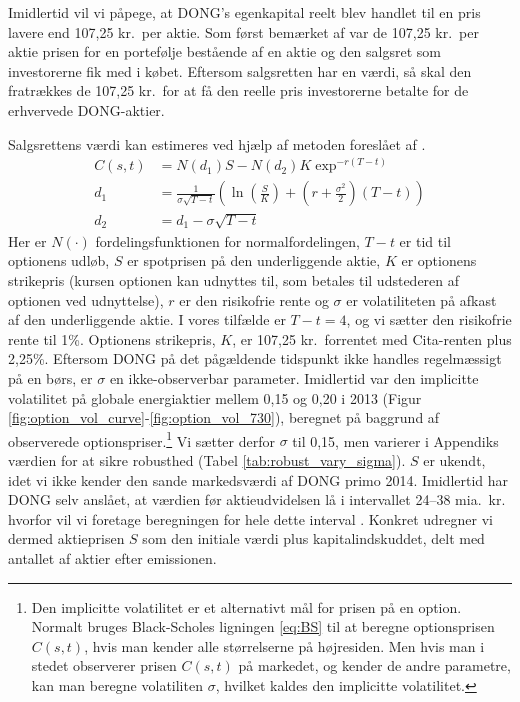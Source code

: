 \documentclass{article}
\begin{document}
Imidlertid vil vi påpege, at DONG's egenkapital reelt blev handlet til en pris lavere end 107,25 kr.\ per aktie. Som først bemærket af \cite{Moeller2014} var de 107,25 kr.\ per aktie prisen for en portefølje bestående af en aktie og den salgsret som investorerne fik med i købet. Eftersom salgsretten har en værdi, så skal den fratrækkes de 107,25 kr.\ for at få den reelle pris investorerne betalte for de erhvervede DONG-aktier.

Salgsrettens værdi kan estimeres ved hjælp af metoden foreslået af \cite{Black1973}. 
\begin{align}
C(s,t)&=N(d_1)S-N(d_2)K \exp^{-r(T-t)} \label{eq:BS}\\
d_1&= \frac{1}{\sigma\sqrt{T-t}}\left( \ln\left( \frac{S}{K} \right)+\left(r+\frac{\sigma^2}{2} \right)(T-t) \right) \nonumber \\
d_2&=d_1-\sigma \sqrt{T-t} \nonumber
\end{align}
Her er $N(\cdot)$ fordelingsfunktionen for normalfordelingen, $T-t$ er tid til optionens udløb, $S$ er spotprisen på den underliggende aktie, $K$ er optionens strikepris (kursen optionen kan udnyttes til, som betales til udstederen af optionen ved udnyttelse), $r$ er den risikofrie rente og $\sigma$ er volatiliteten på afkast af den underliggende aktie. I vores tilfælde er $T-t=4$, og vi sætter den risikofrie rente til 1\%. Optionens strikepris, $K$, er 107,25 kr.\ forrentet med Cita-renten plus 2,25\%. Eftersom DONG på det pågældende tidspunkt ikke handles regelmæssigt på en børs, er $\sigma$ en ikke-observerbar parameter. Imidlertid var den implicitte volatilitet på globale energiaktier mellem 0,15 og 0,20 i 2013 (Figur \ref{fig:option_vol_curve}-\ref{fig:option_vol_730}), beregnet på baggrund af observerede optionspriser.\footnote{Den implicitte volatilitet er et alternativt mål for prisen på en option. Normalt bruges Black-Scholes ligningen \eqref{eq:BS} til at beregne optionsprisen $C(s, t)$, hvis man kender alle størrelserne på højresiden. Men hvis man i stedet observerer prisen $C(s, t)$ på markedet, og kender de andre parametre, kan man beregne volatiliten $\sigma$, hvilket kaldes den implicitte volatilitet.}
Vi sætter derfor $\sigma$ til 0,15, men varierer i Appendiks værdien for at sikre robusthed (Tabel \ref{tab:robust_vary_sigma}). $S$ er ukendt, idet vi ikke kender den sande markedsværdi af DONG primo 2014. Imidlertid har DONG selv anslået, at værdien før aktieudvidelsen lå i intervallet 24--38 mia.\ kr.\, hvorfor vil vi foretage beregningen for hele dette interval \citep{DONG2015b}. Konkret udregner vi dermed aktieprisen $S$ som den initiale værdi plus kapitalindskuddet, delt med antallet af aktier efter emissionen. 
\end{document}
